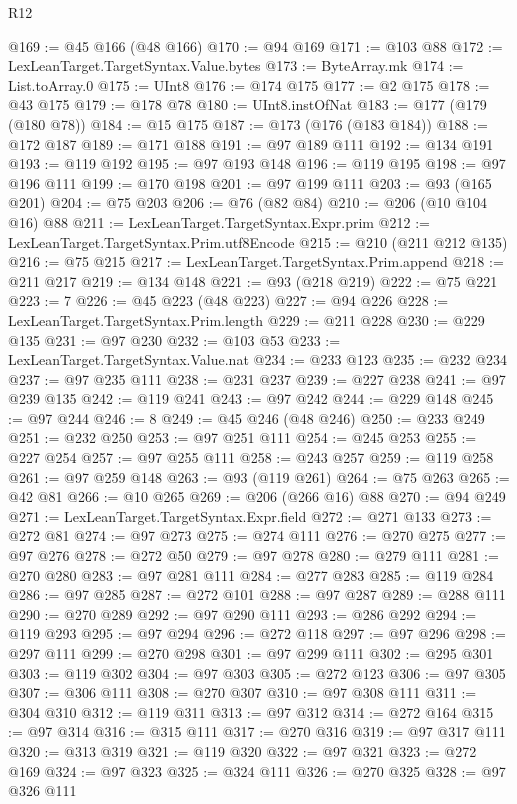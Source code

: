 \begin{lexlean}{R12}
\begin{coremodule}
@169 := @45 @166 (@48 @166)
@170 := @94 @169
@171 := @103 @88
@172 := LexLeanTarget.TargetSyntax.Value.bytes
@173 := ByteArray.mk
@174 := List.toArray.{0}
@175 := UInt8
@176 := @174 @175
@177 := @2 @175
@178 := @43 @175
@179 := @178 @78
@180 := UInt8.instOfNat
@183 := @177 (@179 (@180 @78))
@184 := @15 @175
@187 := @173 (@176 (@183 @184))
@188 := @172 @187
@189 := @171 @188
@191 := @97 @189 @111
@192 := @134 @191
@193 := @119 @192
@195 := @97 @193 @148
@196 := @119 @195
@198 := @97 @196 @111
@199 := @170 @198
@201 := @97 @199 @111
@203 := @93 (@165 @201)
@204 := @75 @203
@206 := @76 (@82 @84)
@210 := @206 (@10 @104 @16) @88
@211 := LexLeanTarget.TargetSyntax.Expr.prim
@212 := LexLeanTarget.TargetSyntax.Prim.utf8Encode
@215 := @210 (@211 @212 @135)
@216 := @75 @215
@217 := LexLeanTarget.TargetSyntax.Prim.append
@218 := @211 @217
@219 := @134 @148
@221 := @93 (@218 @219)
@222 := @75 @221
@223 := 7
@226 := @45 @223 (@48 @223)
@227 := @94 @226
@228 := LexLeanTarget.TargetSyntax.Prim.length
@229 := @211 @228
@230 := @229 @135
@231 := @97 @230
@232 := @103 @53
@233 := LexLeanTarget.TargetSyntax.Value.nat
@234 := @233 @123
@235 := @232 @234
@237 := @97 @235 @111
@238 := @231 @237
@239 := @227 @238
@241 := @97 @239 @135
@242 := @119 @241
@243 := @97 @242
@244 := @229 @148
@245 := @97 @244
@246 := 8
@249 := @45 @246 (@48 @246)
@250 := @233 @249
@251 := @232 @250
@253 := @97 @251 @111
@254 := @245 @253
@255 := @227 @254
@257 := @97 @255 @111
@258 := @243 @257
@259 := @119 @258
@261 := @97 @259 @148
@263 := @93 (@119 @261)
@264 := @75 @263
@265 := @42 @81
@266 := @10 @265
@269 := @206 (@266 @16) @88
@270 := @94 @249
@271 := LexLeanTarget.TargetSyntax.Expr.field
@272 := @271 @133
@273 := @272 @81
@274 := @97 @273
@275 := @274 @111
@276 := @270 @275
@277 := @97 @276
@278 := @272 @50
@279 := @97 @278
@280 := @279 @111
@281 := @270 @280
@283 := @97 @281 @111
@284 := @277 @283
@285 := @119 @284
@286 := @97 @285
@287 := @272 @101
@288 := @97 @287
@289 := @288 @111
@290 := @270 @289
@292 := @97 @290 @111
@293 := @286 @292
@294 := @119 @293
@295 := @97 @294
@296 := @272 @118
@297 := @97 @296
@298 := @297 @111
@299 := @270 @298
@301 := @97 @299 @111
@302 := @295 @301
@303 := @119 @302
@304 := @97 @303
@305 := @272 @123
@306 := @97 @305
@307 := @306 @111
@308 := @270 @307
@310 := @97 @308 @111
@311 := @304 @310
@312 := @119 @311
@313 := @97 @312
@314 := @272 @164
@315 := @97 @314
@316 := @315 @111
@317 := @270 @316
@319 := @97 @317 @111
@320 := @313 @319
@321 := @119 @320
@322 := @97 @321
@323 := @272 @169
@324 := @97 @323
@325 := @324 @111
@326 := @270 @325
@328 := @97 @326 @111

\end{coremodule}
\end{lexlean}
